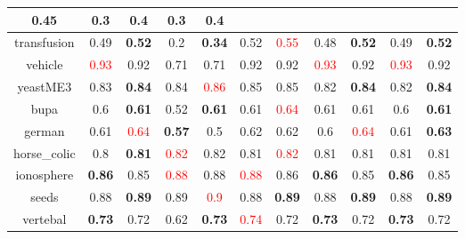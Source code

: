 \documentclass{article}%
\begin{document}
\begin{tabular}{c|cccccccccc}
{0.45
}&0.3&\textbf{0.4}&0.3&\textbf{0.4}\\%
\hline%
transfusion&0.49&\textbf{0.52}&0.2&\textbf{0.34}&0.52&\textcolor{red}{ 
0.55
}&0.48&\textbf{0.52}&0.49&\textbf{0.52}\\%
\hline%
vehicle&\textcolor{red}{ 
0.93
}&0.92&0.71&0.71&0.92&0.92&\textcolor{red}{ 
0.93
}&0.92&\textcolor{red}{ 
0.93
}&0.92\\%
\hline%
yeastME3&0.83&\textbf{0.84}&0.84&\textcolor{red}{ 
0.86
}&0.85&0.85&0.82&\textbf{0.84}&0.82&\textbf{0.84}\\%
\hline%
bupa&0.6&\textbf{0.61}&0.52&\textbf{0.61}&0.61&\textcolor{red}{ 
0.64
}&0.61&0.61&0.6&\textbf{0.61}\\%
\hline%
german&0.61&\textcolor{red}{ 
0.64
}&\textbf{0.57}&0.5&0.62&0.62&0.6&\textcolor{red}{ 
0.64
}&0.61&\textbf{0.63}\\%
\hline%
horse\_colic&0.8&\textbf{0.81}&\textcolor{red}{ 
0.82
}&0.82&0.81&\textcolor{red}{ 
0.82
}&0.81&0.81&0.81&0.81\\%
\hline%
ionosphere&\textbf{0.86}&0.85&\textcolor{red}{ 
0.88
}&0.88&\textcolor{red}{ 
0.88
}&0.86&\textbf{0.86}&0.85&\textbf{0.86}&0.85\\%
\hline%
seeds&0.88&\textbf{0.89}&0.89&\textcolor{red}{ 
0.9
}&0.88&\textbf{0.89}&0.88&\textbf{0.89}&0.88&\textbf{0.89}\\%
\hline%
vertebal&\textbf{0.73}&0.72&0.62&\textbf{0.73}&\textcolor{red}{ 
0.74
}&0.72&\textbf{0.73}&0.72&\textbf{0.73}&0.72\\%
\hline%
\end{tabular}

%
\end{document}
